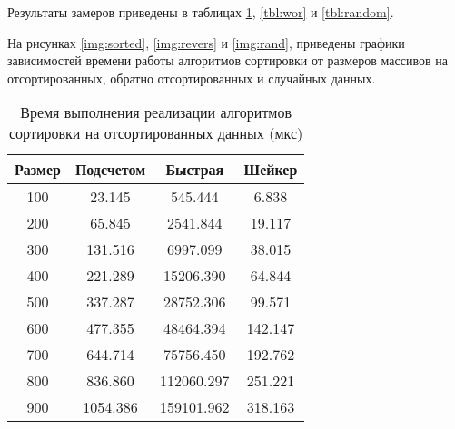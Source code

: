 Результаты замеров приведены в таблицах \ref{tbl:best}, \ref{tbl:wor} и \ref{tbl:random}.

На рисунках \ref{img:sorted}, \ref{img:revers} и \ref{img:rand}, приведены графики зависимостей времени работы алгоритмов сортировки от размеров массивов на отсортированных, обратно отсортированных и случайных данных.



\FloatBarrier

\begin{table}[h]
	\begin{center}
		\caption{Время выполнения реализации алгоритмов сортировки на отсортированных данных (мкс)}
		\label{tbl:best}
		\begin{tabular}{|c|c|c|c|}
			\hline
			 Размер & Подсчетом &  Быстрая &  Шейкер \\
			\hline
			100 &   23.145 &  545.444 &    6.838\\
			\hline
			200 &   65.845 & 2541.844 &   19.117\\
			\hline
			300 &  131.516 & 6997.099 &   38.015\\
			\hline
			400 &  221.289 & 15206.390 &   64.844\\
			\hline
			500 &  337.287 & 28752.306 &   99.571\\
			\hline
			600 &  477.355 & 48464.394 &  142.147\\
			\hline
			700 &  644.714 & 75756.450 &  192.762\\
			\hline
			800 &  836.860 & 112060.297 &  251.221\\
			\hline
			900 & 1054.386 & 159101.962 &  318.163\\
			\hline
		\end{tabular}
	\end{center}
\end{table}
\FloatBarrier



\FloatBarrier

